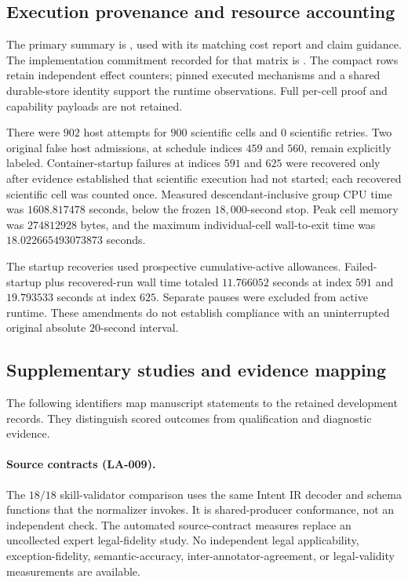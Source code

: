 \subsection{Execution provenance and resource accounting}
\label{app:evaluation-resources}

The primary summary is , used with its matching cost report and claim guidance. The implementation commitment recorded for that matrix is . The compact rows retain independent effect counters; pinned executed mechanisms and a shared durable-store identity support the runtime observations. Full per-cell proof and capability payloads are not retained.

There were $902$ host attempts for $900$ scientific cells and $0$ scientific retries. Two original false host admissions, at schedule indices $459$ and $560$, remain explicitly labeled. Container-startup failures at indices $591$ and $625$ were recovered only after evidence established that scientific execution had not started; each recovered scientific cell was counted once. Measured descendant-inclusive group CPU time was $1608.817478$ seconds, below the frozen $18{,}000$-second stop. Peak cell memory was $274812928$ bytes, and the maximum individual-cell wall-to-exit time was $18.022665493073873$ seconds.

The startup recoveries used prospective cumulative-active allowances. Failed-startup plus recovered-run wall time totaled $11.766052$ seconds at index $591$ and $19.793533$ seconds at index $625$. Separate pauses were excluded from active runtime. These amendments do not establish compliance with an uninterrupted original absolute $20$-second interval.

\subsection{Supplementary studies and evidence mapping}
\label{app:evaluation-evidence-map}

The following identifiers map manuscript statements to the retained development records. They distinguish scored outcomes from qualification and diagnostic evidence.

\paragraph{Source contracts (LA-009).}
The $18/18$ skill-validator comparison uses the same Intent IR decoder and schema functions that the normalizer invokes. It is shared-producer conformance, not an independent check. The automated source-contract measures replace an uncollected expert legal-fidelity study. No independent legal applicability, exception-fidelity, semantic-accuracy, inter-annotator-agreement, or legal-validity measurements are available. 

